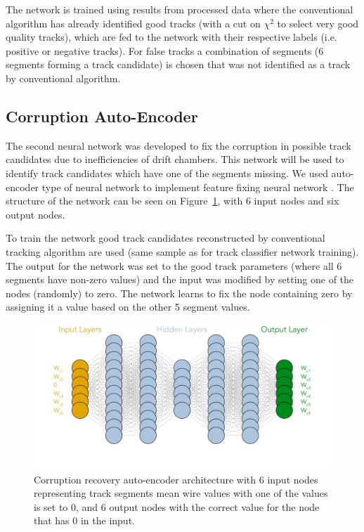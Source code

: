 The network is trained using results from processed data where the conventional algorithm has already 
identified good tracks (with a cut on $\chi^2$ to select very good quality tracks), which are fed to the network with
their respective labels (i.e. positive or negative tracks). For false tracks a combination of segments (6 segments 
forming a track candidate) is chosen that was not identified as a track by conventional algorithm.
 
 \subsection{Corruption Auto-Encoder}
 
The second neural network was developed to fix the corruption in possible track candidates due to 
inefficiencies of drift chambers. This network will be used to identify track candidates which have one of the segments
missing. We used auto-encoder type of neural network to implement feature fixing neural network \cite{Gavalian:2020xmc}. 
The structure of the network can be seen on Figure~\ref{autoencoder:architecture}, with 6 input nodes and six output nodes.

To train the network good track candidates reconstructed by conventional tracking algorithm are used (same sample 
as for track classifier network training). The output for the network was set to the good track parameters (where all 6 
segments have non-zero values) and the input was modified by setting one of the nodes (randomly) to zero. The network
learns to fix the node containing zero by assigning it a value based on the other 5 segment values. 

 \begin{figure}[!ht]
\begin{center}
\includegraphics[width=4.5in]{images/aue_diagram.pdf}
\caption {Corruption recovery auto-encoder architecture with 6 input nodes representing track segments mean wire values with one of the values is set to 0, and 6 output nodes with the correct value for the node that has 0 in the input. }
 \label{autoencoder:architecture}
 \end{center}
\end{figure}

